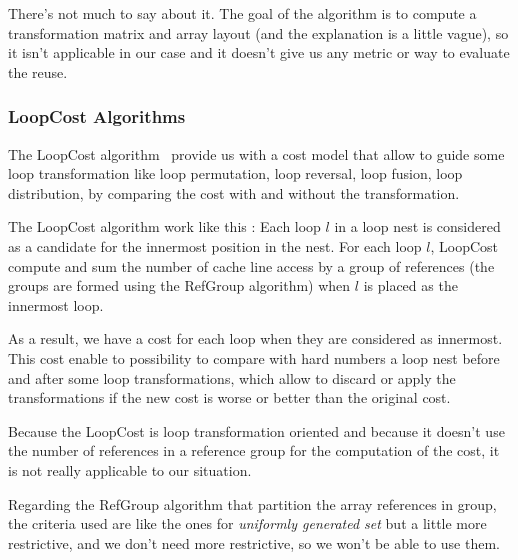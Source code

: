 \documentclass[paper=a4, fontsize=11pt]{scrartcl}
\numberwithin{equation}{section}        %
\numberwithin{figure}{section}          %
\numberwithin{table}{section}               %
\begin{document}
            There's not much to say about it. The goal of the algorithm is to
            compute a transformation matrix and array layout (and the explanation is a little
            vague), so it isn't applicable in our case and it doesn't give us any metric or way to evaluate the reuse.
        
        \subsubsection{LoopCost Algorithms}
            The LoopCost algorithm~\cite{McKinley:1996:IDL:233561.233564} provide
            us with a cost model that allow to guide some loop transformation like
            loop permutation, loop reversal, loop fusion, loop distribution,
            by comparing the cost with and without the transformation.
            
            The LoopCost algorithm work like this : 
            Each loop $l$ in a loop nest is considered as a candidate for the innermost
            position in the nest. For each loop $l$, LoopCost compute and sum the number
            of cache line access by a group of references (the groups are formed
            using the RefGroup algorithm) when $l$ is placed as the innermost loop.

            As a result, we have a cost for each loop when they are considered as innermost.
            This cost enable to possibility to compare with hard numbers
            a loop nest before and after some loop transformations, which allow to discard
            or apply the transformations if the new cost is worse or better than the
            original cost.
            \bigskip

            Because the LoopCost is loop transformation oriented and because it doesn't
            use the number of references in a reference group for the computation
            of the cost, it is not really applicable to our situation.

            Regarding the RefGroup algorithm that partition the array references
            in group, the criteria used are like the ones for \textit{uniformly generated set}
            but a little more restrictive, and we don't need more restrictive, so we won't
            be able to use them.
            
            
\end{document}
